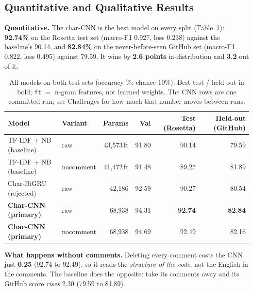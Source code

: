 \documentclass{article}
\begin{document}
\vspace{-8pt}
\subsection{Quantitative and Qualitative Results}
\label{sec:qual}
\vspace{-4pt}

\textbf{Quantitative.} The char-CNN is the best model on every split (Table~\ref{tab:results}):
\textbf{92.74\%} on the Rosetta test set (macro-F1 0.927, loss 0.238) against the baseline's 90.14,
and \textbf{82.84\%} on the never-before-seen GitHub set (macro-F1 0.822, loss 0.495) against 79.59.
It wins by \textbf{2.6 points} in-distribution and \textbf{3.2} out of it.

\begin{table}[h]
\centering\scriptsize
\caption{All models on both test sets (accuracy \%; chance 10\%). Best test / held-out in bold;
\texttt{ft} $=$ n-gram features, not learned weights. The CNN rows are one committed run; see
Challenges for how much that number moves between runs.}
\label{tab:results}
\vspace{-3pt}
\begin{tabular}{@{}llrrrr@{}}
\toprule
\textbf{Model} & \textbf{Variant} & \textbf{Params} & \textbf{Val} &
\textbf{Test (Rosetta)} & \textbf{Held-out (GitHub)} \\
\midrule
TF-IDF + NB (baseline)      & raw       & 43{,}573\,ft & 91.80 & 90.14 & 79.59 \\
TF-IDF + NB (baseline)      & nocomment & 41{,}472\,ft & 91.48 & 89.27 & 81.89 \\
Char-BiGRU (rejected)       & raw       & 42{,}186 & 92.59 & 90.27 & 80.54 \\
\textbf{Char-CNN (primary)} & raw       & 68{,}938 & 94.31 & \textbf{92.74} & \textbf{82.84} \\
\textbf{Char-CNN (primary)} & nocomment & 68{,}938 & 94.69 & 92.49 & 82.16 \\
\bottomrule
\end{tabular}
\vspace{-4pt}
\end{table}

\textbf{What happens without comments.} Deleting every comment costs the CNN just \textbf{0.25}
(92.74 to 92.49), so it reads the \emph{structure of the code}, not the English in the comments.
The baseline does the opposite: take its comments away and its GitHub score \emph{rises} 2.30
(79.59 to 81.89).
\end{document}
